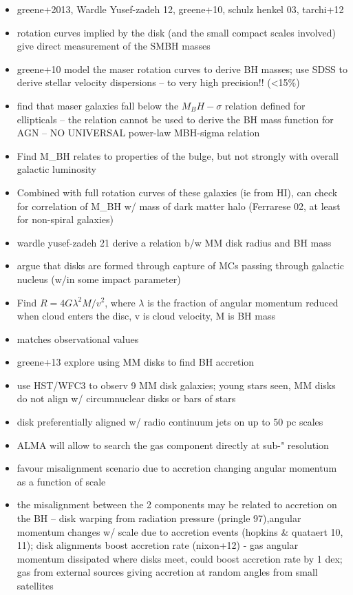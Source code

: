 \begin{itemize}
\item greene+2013, Wardle Yusef-zadeh 12, greene+10, schulz henkel 03, tarchi+12
\item rotation curves implied by the disk (and the small compact scales involved) give direct measurement of the SMBH masses
\item greene+10 model the maser rotation curves to derive BH masses; use SDSS to derive stellar velocity dispersions -- to very high precision!! (<15\%)
\item find that maser galaxies fall below the $M_BH-\sigma$ relation defined for ellipticals -- the relation cannot be used to derive the BH mass function for AGN -- NO UNIVERSAL power-law MBH-sigma relation
\item Find M_BH relates to properties of the bulge, but not strongly with overall galactic luminosity
\item Combined with full rotation curves of these galaxies (ie from HI), can check for correlation of M_BH w/ mass of dark matter halo (Ferrarese 02, at least for non-spiral galaxies)
\item wardle yusef-zadeh 21 derive a relation b/w MM disk radius and BH mass
\item argue that disks are formed through capture of MCs passing through galactic nucleus (w/in some impact parameter)
\item Find $R=4G\lambda^2M/v^2$, where $\lambda$ is the fraction of angular momentum reduced when cloud enters the disc, v is cloud velocity, M is BH mass
\item matches observational values
\item greene+13 explore using MM disks to find BH accretion
\item use HST/WFC3 to observ 9 MM disk galaxies; young stars seen, MM disks do not align w/ circumnuclear disks or bars of stars
\item disk preferentially aligned w/ radio continuum jets on up to 50 pc scales
\item ALMA will allow to search the gas component directly at sub-" resolution
\item favour misalignment scenario due to accretion changing angular momentum as a function of scale
\item the misalignment between the 2 components may be related to accretion on the BH -- disk warping from radiation pressure (pringle 97),angular momentum changes w/ scale due to accretion events (hopkins \& quataert 10, 11); disk alignments boost accretion rate (nixon+12) - gas angular momentum dissipated where disks meet, could boost accretion rate by 1 dex; gas from external sources giving accretion at random angles from small satellites
\end{itemize}

